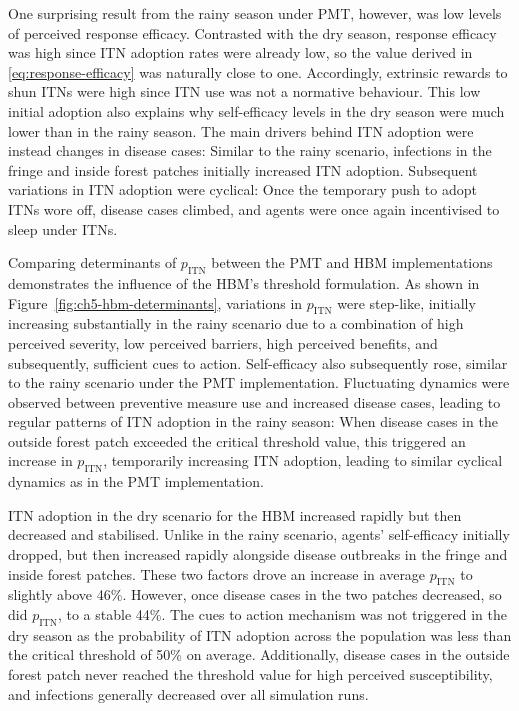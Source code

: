 One surprising result from the rainy season under PMT, however, was low levels of perceived response efficacy. Contrasted with the dry season, response efficacy was high since ITN adoption rates were already low, so the value derived in \eqref{eq:response-efficacy} was naturally close to one. Accordingly, extrinsic rewards to shun ITNs were high since ITN use was not a normative behaviour. This low initial adoption also explains why self-efficacy levels in the dry season were much lower than in the rainy season. The main drivers behind ITN adoption were instead changes in disease cases: Similar to the rainy scenario, infections in the fringe and inside forest patches initially increased ITN adoption. Subsequent variations in ITN adoption were cyclical: Once the temporary push to adopt ITNs wore off, disease cases climbed, and agents were once again incentivised to sleep under ITNs.

Comparing determinants of $p_{\text{ITN}}$ between the PMT and HBM implementations demonstrates the influence of the HBM's threshold formulation. As shown in Figure~\ref{fig:ch5-hbm-determinants}, variations in $p_{\text{ITN}}$ were step-like, initially increasing substantially in the rainy scenario due to a combination of high perceived severity, low perceived barriers, high perceived benefits, and subsequently, sufficient cues to action. Self-efficacy also subsequently rose, similar to the rainy scenario under the PMT implementation. Fluctuating dynamics were observed between preventive measure use and increased disease cases, leading to regular patterns of ITN adoption in the rainy season: When disease cases in the outside forest patch exceeded the critical threshold value, this triggered an increase in $p_{\text{ITN}}$, temporarily increasing ITN adoption, leading to similar cyclical dynamics as in the PMT implementation.

ITN adoption in the dry scenario for the HBM increased rapidly but then decreased and stabilised. Unlike in the rainy scenario, agents' self-efficacy initially dropped, but then increased rapidly alongside disease outbreaks in the fringe and inside forest patches. These two factors drove an increase in average $p_{\text{ITN}}$ to slightly above 46\%. However, once disease cases in the two patches decreased, so did $p_{\text{ITN}}$, to a stable 44\%. The cues to action mechanism was not triggered in the dry season as the probability of ITN adoption across the population was less than the critical threshold of 50\% on average. Additionally, disease cases in the outside forest patch never reached the threshold value for high perceived susceptibility, and infections generally decreased over all simulation runs.

